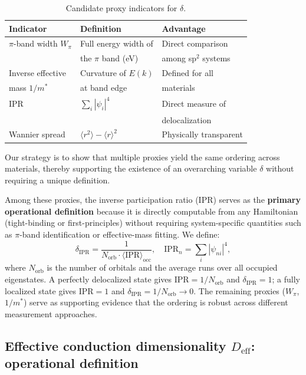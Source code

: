\documentclass[twocolumn,showpacs,preprintnumbers,amsmath,amssymb,prb]{revtex4-2}
\begin{document}
\begin{table}[h]
\caption{Candidate proxy indicators for $\delta$.}
\label{tab:delta_proxies}
\begin{ruledtabular}
\begin{tabular}{lll}
  Indicator & Definition & Advantage \\
  \hline
  $\pi$-band width $W_\pi$ & Full energy width of & Direct comparison \\
   & the $\pi$ band (eV) & among sp$^2$ systems \\
  Inverse effective & Curvature of $E(k)$ & Defined for all \\
  mass $1/m^*$ & at band edge & materials \\
  IPR & $\sum_i |\psi_i|^4$ & Direct measure of \\
   & & delocalization \\
  Wannier spread & $\langle r^2 \rangle - \langle r \rangle^2$ &
  Physically transparent \\
\end{tabular}
\end{ruledtabular}
\end{table}

Our strategy is to show that multiple proxies yield the same ordering
across materials, thereby supporting the existence of an overarching
variable $\delta$ without requiring a unique definition.

Among these proxies, the inverse participation ratio (IPR) serves as
the \textbf{primary operational definition} because it is directly
computable from any Hamiltonian (tight-binding or first-principles)
without requiring system-specific quantities such as $\pi$-band
identification or effective-mass fitting. We define:
\begin{equation}
  \delta_\mathrm{IPR} = \frac{1}{N_\mathrm{orb} \cdot
    \langle \mathrm{IPR} \rangle_\mathrm{occ}},
  \quad
  \mathrm{IPR}_n = \sum_i |\psi_{ni}|^4,
  \label{eq:delta_IPR}
\end{equation}
where $N_\mathrm{orb}$ is the number of orbitals and the average runs
over all occupied eigenstates. A perfectly delocalized state gives
$\mathrm{IPR} = 1/N_\mathrm{orb}$ and $\delta_\mathrm{IPR} = 1$;
a fully localized state gives $\mathrm{IPR} = 1$ and
$\delta_\mathrm{IPR} = 1/N_\mathrm{orb} \to 0$.
The remaining proxies ($W_\pi$, $1/m^*$) serve as supporting evidence
that the ordering is robust across different measurement approaches.

\subsection{Effective conduction dimensionality $D_\mathrm{eff}$:
  operational definition}
\label{sec:Deff}
\end{document}
